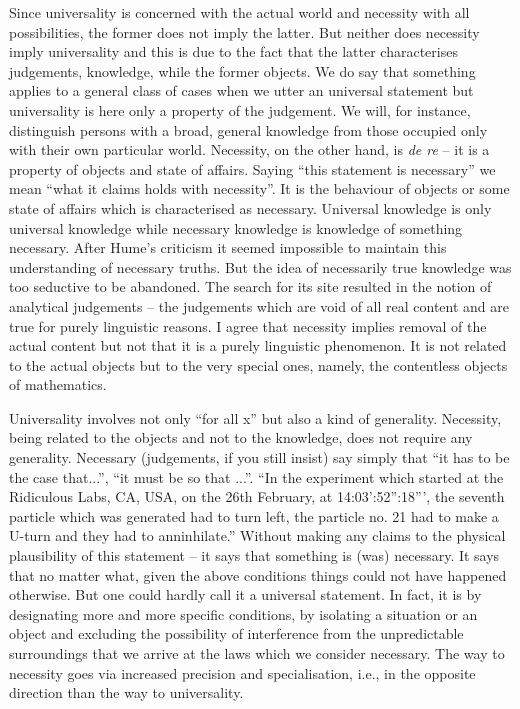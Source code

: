 Since universality is concerned with the actual world and necessity with all possibilities, the former does not imply the latter. But neither does necessity imply universality and this is due to the fact that the latter characterises judgements, knowledge, while the former objects. We do say that something applies to a general class of cases when we utter an universal statement but universality is here only a property of the judgement. We will, for instance, distinguish persons with a broad, general knowledge from those occupied only with their own particular world. Necessity, on the other hand, is {\em de re} -- it is a property of objects and state of affairs. Saying ``this statement is necessary'' we mean ``what it claims holds with necessity''. It is the behaviour of objects or some state of affairs which is characterised as necessary. Universal knowledge is only universal knowledge while necessary knowledge is knowledge of something necessary. After Hume's criticism it seemed impossible to maintain this understanding of necessary truths. But the idea of necessarily true knowledge was too seductive to be abandoned. The search for its site resulted in the notion of analytical judgements -- the judgements which are void of all real content and are true for purely linguistic reasons. I agree that necessity implies removal of the actual content but not that it is a purely linguistic phenomenon. It is not related to the actual objects but to the very special ones, namely, the contentless objects of mathematics.

Universality involves not only  ``for all x'' but also a kind of generality. Necessity, being related to the objects and not to the knowledge, does not require any generality. Necessary (judgements, if you still insist) say simply that ``it has to be the case that...'', ``it must be so that ...''. ``In the experiment which started at the Ridiculous Labs, CA, USA, on the 26th February, at 
14:03':52'':18''', 
the seventh particle which was generated had to turn left, the particle no. 21 had to make a U-turn and they had to anninhilate.''  Without making any claims to the physical plausibility of this statement -- it says that something is (was) necessary. It says that no matter what, given the above conditions things could not have happened otherwise. But one could hardly call it a universal statement. In fact, it is by designating more and more specific conditions, by isolating a situation or an object and excluding the possibility of interference from the unpredictable surroundings that we arrive at the laws which we consider necessary. The way to necessity goes via increased precision and specialisation, i.e., in the opposite direction than the way to universality. 

